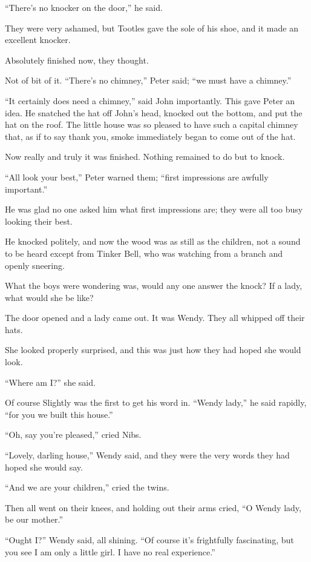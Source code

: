 ``There's no knocker on the door,'' he said.

They were very ashamed, but Tootles gave the sole of his shoe, and it made an
excellent knocker.

Absolutely finished now, they thought.

Not of bit of it.
``There's no chimney,'' Peter said; ``we must have a chimney.''

``It certainly does need a chimney,'' said John importantly. This gave Peter an
idea.
He snatched the hat off John's head, knocked out the bottom, and put the hat on
the roof.
The little house was so pleased to have such a capital chimney that, as if to
say thank you, smoke immediately began to come out of the hat.

Now really and truly it was finished.
Nothing remained to do but to knock.

``All look your best,'' Peter warned them; ``first impressions are awfully
important.''

He was glad no one asked him what first impressions are; they were all too busy
looking their best.

He knocked politely, and now the wood was as still as the children, not a sound
to be heard except from Tinker Bell, who was watching from a branch and openly
sneering.

What the boys were wondering was, would any one answer the knock?
If a lady, what would she be like?

The door opened and a lady came out.
It was Wendy.
They all whipped off their hats.

She looked properly surprised, and this was just how they had hoped she
would look.

``Where am I?'' she said.

Of course Slightly was the first to get his word in. ``Wendy lady,'' he
said rapidly, ``for you we built this house.''

``Oh, say you're pleased,'' cried Nibs.

``Lovely, darling house,'' Wendy said, and they were the very words they
had hoped she would say.

``And we are your children,'' cried the twins.

Then all went on their knees, and holding out their arms cried, ``O
Wendy lady, be our mother.''

``Ought I?'' Wendy said, all shining.
``Of course it's frightfully fascinating, but you see I am only a little girl.
I have no real experience.''

